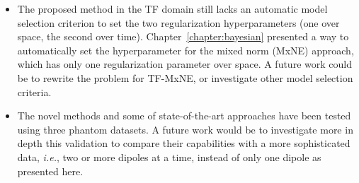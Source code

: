 \begin{itemize}
\item The proposed method in the TF domain still lacks an automatic model selection criterion to set the two regularization hyperparameters (one over space, the second over time). Chapter~\ref{chapter:bayesian} presented a way to automatically set the hyperparameter for the mixed norm (MxNE) approach, which has only one regularization parameter over space. A future work could be to rewrite the problem for TF-MxNE, or investigate other model selection criteria.

\item The novel methods and some of state-of-the-art approaches have been tested using three phantom datasets. A future work would be to investigate more in depth this validation to compare their capabilities with a more sophisticated data, \textit{i.e.}, two or more dipoles at a time, instead of only one dipole as presented here.

\end{itemize}
